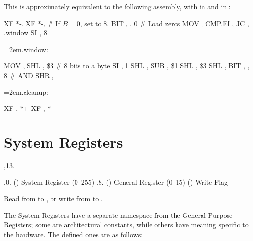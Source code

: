This is approximately equivalent to the following assembly, with  in
 and  in :

\startblock
	XF *-, 
	XF *-, 
	\# If $B = 0$, set  to 8.
	BIT , , 0  \# Load zeros
	MOV , 
	CMP.EI , 
	JC , .window
	SI , 8
{\leftskip=2em.window:\par}
	MOV , 
	SHL , \$3  \# 8 bits to a byte
	SI , 1
	SHL , 
	SUB , \$1
	SHL , \$3
	SHL , 
	BIT , , 8  \# AND
	SHR , 
{\leftskip=2em.cleanup:\par}
	XF , *+
	XF , *+
\endblock

\section{System Registers}

\noindent\ins{},13. 

\li \ins{},0. () System Register (0--255)
\li \ins{},8. () General Register (0--15)
\li \ins{} () Write Flag

Read from  to , or write from  to .

The System Registers have a separate namespace from the General-Purpose
Registers; some are architectural constants, while others have meaning specific
to the hardware. The defined ones are as follows:

